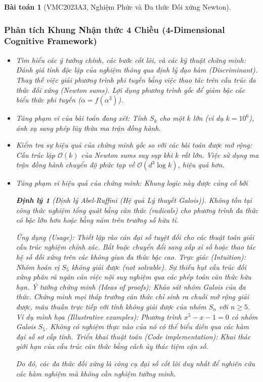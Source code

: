 \documentclass{article}
\newtheorem{baitoan}{Bài toán}
\newtheorem{dinhly}{Định lý}
\begin{document}
\begin{baitoan}[VMC2023A3, Nghiệm Phức và Đa thức Đối xứng Newton]


 \subsubsection*{Phân tích Khung Nhận thức 4 Chiều (4-Dimensional Cognitive Framework)}
 \begin{itemize}
 \item \textit{Tìm hiểu các ý tưởng chính, các bước cốt lõi, và các kỹ thuật chứng minh}: Đánh giá tính độc lập của nghiệm thông qua định lý đạo hàm (Discriminant). Thay thế việc giải phương trình phi tuyến bằng việc thao tác trên cấu trúc đa thức đối xứng (Newton sums). Lợi dụng phương trình gốc để giảm bậc các biểu thức phi tuyến ($\alpha = f(\alpha^3)$).
 \item \textit{Tăng phạm vi của bài toán đang xét}: Tính $S_k$ cho một $k$ lớn (ví dụ $k=10^6$), ánh xạ sang phép lũy thừa ma trận đồng hành.
 \item \textit{Kiểm tra sự hiệu quả của chứng minh gốc so với các bài toán được mở rộng}: Cấu trúc lặp $\mathcal{O}(k)$ của Newton sums suy sụp khi $k$ rất lớn. Việc sử dụng ma trận đồng hành chuyển độ phức tạp về $\mathcal{O}(d^3 \log k)$, hiệu quả hơn.
 \item \textit{Tăng phạm vi hiệu quả của chứng minh}: Khung logic này được củng cố bởi \begin{dinhly}[Định lý Abel-Ruffini (Hệ quả Lý thuyết Galois)]
 Không tồn tại công thức nghiệm tổng quát bằng căn thức (radicals) cho phương trình đa thức có bậc lớn hơn hoặc bằng năm trên trường số hữu tỉ.
 \end{dinhly}
 \emph{Ứng dụng (Usage):} Thiết lập rào cản đại số tuyệt đối cho các thuật toán giải cấu trúc nghiệm chính xác. Bắt buộc chuyển đổi sang xấp xỉ số hoặc thao tác hệ số đối xứng trên các không gian đa thức bậc cao.
 \emph{Trực giác (Intuition):} Nhóm hoán vị $S_5$ không giải được (not solvable). Sự thiếu hụt cấu trúc đối xứng phân rã ngăn cản việc nội suy nghiệm qua các phép toán căn thức hữu hạn.
 \emph{Ý tưởng chứng minh (Ideas of proofs):} Khảo sát nhóm Galois của đa thức. Chứng minh mọi tháp trường căn thức chỉ sinh ra chuỗi mở rộng giải được, mâu thuẫn trực tiếp với tính không giải được của nhóm $S_n$ với $n \ge 5$.
 \emph{Ví dụ minh họa (Illustrative examples):} Phương trình $x^5 - x - 1 = 0$ có nhóm Galois $S_5$. Không có nghiệm thực nào của nó có thể biểu diễn qua các hàm đại số sơ cấp tĩnh.
 \emph{Triển khai thuật toán (Code implementation):}
 Khai thác giới hạn của cấu trúc căn thức bằng cách ủy thác tiệm cận số.
 
 Do đó, các đa thức đối xứng là công cụ đại số cốt lõi duy nhất để nghiên cứu các hàm nghiệm mà không cần nghiệm tường minh.
 \end{itemize}
\end{baitoan}
\end{document}
